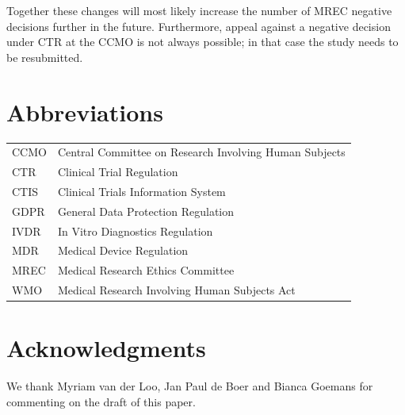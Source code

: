 \documentclass[authordate, empirical]{jote-new-article}
\begin{document}
	Together these changes will most likely increase the number of MREC negative decisions further in the future. Furthermore, appeal against a negative decision under CTR at the CCMO is not always possible; in that case the study needs to be resubmitted.












	\section{Abbreviations}

\begin{tabularx}{\linewidth}{l X}
	CCMO & Central Committee on Research Involving Human Subjects \\
	CTR & Clinical Trial Regulation \\
	CTIS & Clinical Trials Information System \\
	GDPR & General Data Protection Regulation \\
	IVDR & In Vitro Diagnostics Regulation \\
	MDR & Medical Device Regulation \\
	MREC & Medical Research Ethics Committee \\
	WMO & Medical Research Involving Human Subjects Act
\end{tabularx}









	\section{Acknowledgments}



	We thank Myriam van der Loo, Jan Paul de Boer and Bianca Goemans for commenting on the draft of this paper.


\printbibliography
\end{document}
